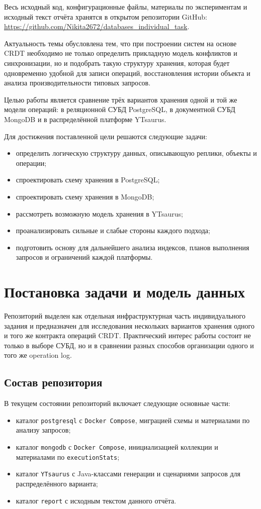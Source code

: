 \documentclass[a4paper,14pt]{extarticle}
\def\uppercase#1{#1}%
\def\makefirstuc#1{#1}%
\def\normalsize{}%
\newcommand{\withnumber}[1]{%
    \clearpage
    \section{\uppercase{#1}}
}
\newcommand{\mysubsection}[1]{%
    \subsection{\normalsize\makefirstuc{#1}}
}
\begin{document}
Весь исходный код, конфигурационные файлы, материалы по экспериментам и
исходный текст отчёта хранятся в открытом репозитории GitHub:
\url{https://github.com/Nikita2672/databases_individual_task}.

Актуальность темы обусловлена тем, что при построении систем на основе CRDT
необходимо не только определить прикладную модель конфликтов и синхронизации,
но и подобрать такую структуру хранения, которая будет одновременно удобной
для записи операций, восстановления истории объекта и анализа производительности
типовых запросов.

Целью работы является сравнение трёх вариантов хранения одной и той же модели
операций: в реляционной СУБД PostgreSQL, в документной СУБД MongoDB и в
распределённой платформе YTsaurus.

Для достижения поставленной цели решаются следующие задачи:
\begin{itemize}[leftmargin=1.25cm]
    \item определить логическую структуру данных, описывающую реплики, объекты и операции;
    \item спроектировать схему хранения в PostgreSQL;
    \item спроектировать схему хранения в MongoDB;
    \item рассмотреть возможную модель хранения в YTsaurus;
    \item проанализировать сильные и слабые стороны каждого подхода;
    \item подготовить основу для дальнейшего анализа индексов, планов выполнения запросов и ограничений каждой платформы.
\end{itemize}

\withnumber{Постановка задачи и модель данных}

Репозиторий выделен как отдельная инфраструктурная часть индивидуального задания
и предназначен для исследования нескольких вариантов хранения одного и того же
контракта операций CRDT. Практический интерес работы состоит не только в выборе
СУБД, но и в сравнении разных способов организации одного и того же operation log.

\mysubsection{Состав репозитория}

В текущем состоянии репозиторий включает следующие основные части:
\begin{itemize}[leftmargin=1.25cm]
    \item каталог \texttt{postgresql} с \texttt{Docker Compose}, миграцией схемы и материалами по анализу запросов;
    \item каталог \texttt{mongodb} с \texttt{Docker Compose}, инициализацией коллекции и материалами по \texttt{executionStats};
    \item каталог \texttt{YTsaurus} с Java-классами генерации и сценариями запросов для распределённого варианта;
    \item каталог \texttt{report} с исходным текстом данного отчёта.
\end{itemize}
\end{document}
